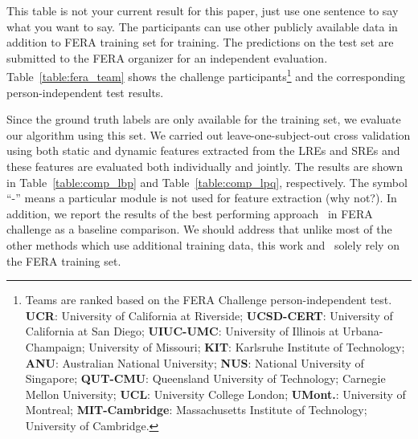 \documentclass[journal]{IEEEtran}
\begin{document}
\textcolor[rgb]{1,0,0}{This table is not your current result for this paper, just use one sentence to say what you want to say. The participants can use other publicly available data in addition to FERA training set for training. The predictions on the test set are submitted to the FERA organizer for an independent evaluation. Table~\ref{table:fera_team} shows the challenge participants\footnote{\label{teams}Teams are ranked based on the FERA Challenge person-independent test. \textbf{UCR}: University of California at Riverside; \textbf{UCSD-CERT}: University of California at San Diego; \textbf{UIUC-UMC}: University of Illinois at Urbana-Champaign; University of Missouri; \textbf{KIT}: Karlsruhe Institute of Technology; \textbf{ANU}: Australian National University; \textbf{NUS}: National University of Singapore; \textbf{QUT-CMU}: Queensland University of Technology; Carnegie Mellon University; \textbf{UCL}: University College London; \textbf{UMont.}: University of Montreal;  \textbf{MIT-Cambridge}: Massachusetts Institute of Technology; University of Cambridge.} and the corresponding person-independent test results. }

Since the ground truth labels are only available for the training set, we evaluate our algorithm using this set. We carried out leave-one-subject-out cross validation using both static and dynamic features extracted from the LREs and SREs and these features are evaluated both individually and jointly. The results are shown in Table~\ref{table:comp_lbp} and Table~\ref{table:comp_lpq}, respectively. The symbol ``-'' means a particular module is not used for feature extraction \textcolor[rgb]{1,0,0}{(why not?)}. In addition, we report the results of the best performing approach~\cite{Yang_SMCB12} in FERA challenge as a baseline comparison. We should address that unlike most of the other methods which use additional training data, this work and~\cite{Yang_SMCB12} solely rely on the FERA training set. 
\end{document}
